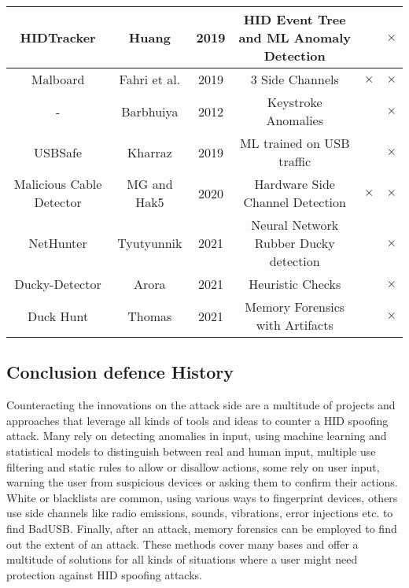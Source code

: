 {\begin{tabular}{|c c c c c c|}
\hline
 HIDTracker & Huang \cite{IdentifyingHIDbasedAttacks2019} & 2019 & HID Event Tree and ML Anomaly Detection & & $\times$ \\
 \hline
 Malboard & Fahri et al. \cite{farhiMalboardNovelUser2019} & 2019 & 3 Side Channels & $\times$ & $\times$\\
 \hline
- & Barbhuiya \cite{barbhuiyaAnomalyBasedApproach2012} & 2012 & Keystroke Anomalies & & $\times$ \\
 \hline
 USBSafe & Kharraz \cite{kharrazUSBESAFEEndPointSolution2019} & 2019 & ML trained on USB traffic & & $\times$\\
 \hline
 Malicious Cable Detector & MG and Hak5 \cite{hak5MaliciousCableDetector} & 2020 & Hardware Side Channel Detection & $\times$ & $\times$ \\
 \hline
 NetHunter & Tyutyunnik \cite{IntelligentSystemPreventing} & 2021 & Neural Network Rubber Ducky detection & & $\times$\\
 \hline
 Ducky-Detector & Arora \cite{USBRubberDucky2021} & 2021 & Heuristic Checks & & $\times$\\
 \hline
 Duck Hunt & Thomas \cite{thomasDuckHuntMemory2021} & 2021 & Memory Forensics with Artifacts & & $\times$ \\
\hline
\end{tabular}
}%



\subsection{Conclusion defence History}

Counteracting the innovations on the attack side are a multitude of projects and approaches that leverage all kinds of tools and ideas to counter a HID spoofing attack. Many rely on detecting anomalies in input, using machine learning and statistical models to distinguish between real and human input, multiple use filtering and static rules to allow or disallow actions, some rely on user input, warning the user from suspicious devices or asking them to confirm their actions. White or blacklists are common, using various ways to fingerprint devices, others use side channels like radio emissions, sounds, vibrations, error injections etc. to find BadUSB. Finally, after an attack, memory forensics can be employed to find out the extent of an attack. These methods cover many bases and offer a multitude of solutions for all kinds of situations where a user might need protection against HID spoofing attacks.


